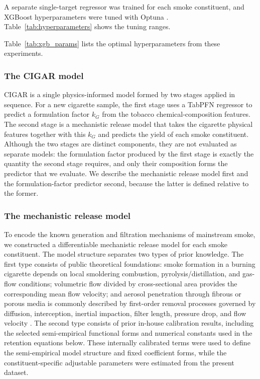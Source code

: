 ﻿\documentclass[a4paper,fleqn]{cas-sc}
\begin{document}
A separate single-target regressor was trained for each smoke constituent, and
XGBoost hyperparameters were tuned with Optuna \cite{akiba2019optuna}.
Table~\ref{tab:hyperparameters} shows the tuning ranges.



Table~\ref{tab:xgb_params} lists the optimal hyperparameters from these experiments.




\subsubsection{The CIGAR model}

CIGAR is a single physics-informed model formed by two stages applied in
sequence. For a new cigarette sample, the first stage uses a TabPFN regressor
to predict a formulation factor $k_G$ from the tobacco chemical-composition
features. The second stage is a mechanistic release model that takes the
cigarette physical features together with this $k_G$ and predicts the yield of
each smoke constituent. Although the two stages are distinct components, they
are not evaluated as separate models: the formulation factor produced by the
first stage is exactly the quantity the second stage requires, and only their
composition forms the predictor that we evaluate. We describe the mechanistic release model first and the
formulation-factor predictor second, because the latter is defined relative to
the former.

\subsubsection{The mechanistic release model}

To encode the known generation and filtration mechanisms of mainstream smoke, we constructed a differentiable mechanistic release model for each smoke constituent. The model structure separates two types of prior knowledge. The first type consists of public theoretical foundations: smoke formation in a burning cigarette depends on local smoldering combustion, pyrolysis/distillation, and gas-flow conditions; volumetric flow divided by cross-sectional area provides the corresponding mean flow velocity; and aerosol penetration through fibrous or porous media is commonly described by first-order removal processes governed by diffusion, interception, inertial impaction, filter length, pressure drop, and flow velocity \cite{torero2020smouldering,liu2020particulate,xu2020airfiltering}. The second type consists of prior in-house calibration results, including the selected semi-empirical functional forms and numerical constants used in the retention equations below. These internally calibrated terms were used to define the semi-empirical model structure and fixed coefficient forms, while the constituent-specific adjustable parameters were estimated from the present dataset.
\end{document}
